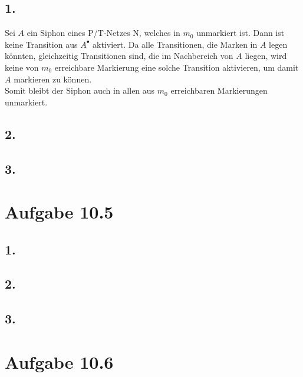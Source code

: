 \documentclass[12pt, paper=a4]{article}
\begin{document}
\subsection*{1.}
Sei \(A\) ein Siphon eines P/T-Netzes N, welches in \(m_0\) unmarkiert ist. Dann ist keine Transition aus \(A^{\bullet}\) aktiviert. Da alle Transitionen, die Marken in \(A\) legen k\"onnten, gleichzeitig Transitionen sind, die im Nachbereich von  \(A\) liegen, wird keine von \(m_0\) erreichbare Markierung eine solche Transition aktivieren, um damit \(A\) markieren zu k\"onnen.\\
Somit bleibt der Siphon auch in allen aus \(m_0\) erreichbaren Markierungen unmarkiert.

\subsection*{2.}
\subsection*{3.}


\section*{Aufgabe 10.5}
\subsection*{1.}
\subsection*{2.}
\subsection*{3.}

\section*{Aufgabe 10.6}
\end{document}
